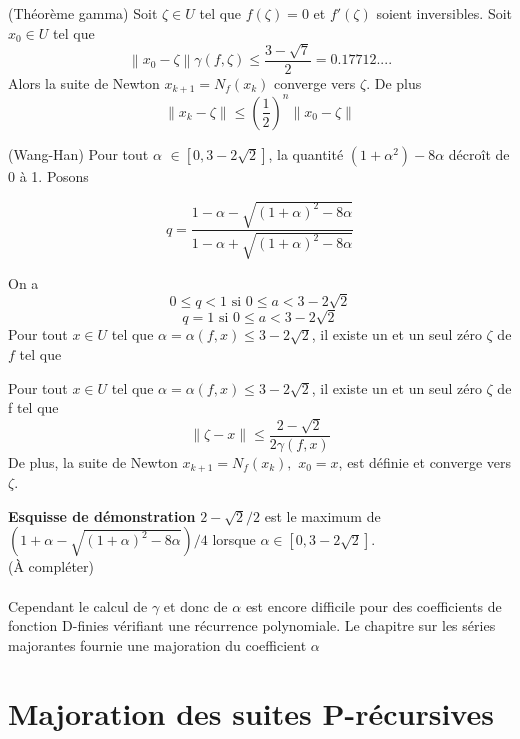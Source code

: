 \documentclass[a4paper,10.5pt]{article}
\begin{document}
	\begin{theorem}(Théorème gamma) Soit $\zeta \in U$ tel que $f(\zeta)=0$ et $f'(\zeta)$ soient inversibles. Soit $x_{0} \in U$ tel que \\
		\[\left\|x_{0}-\zeta\right\|\gamma(f,\zeta) \leq \frac{3-\sqrt{7}}{2}=0.17712.... \]
		Alors la suite de Newton $x_{k+1}=N_{f}(x_{k})$ converge vers $\zeta$. De plus\\
		\[\left\|x_{k}-\zeta\right\| \leq \left(\frac{1}{2}\right)^{n}\left\|x_{0}-\zeta\right\|\]
	\end{theorem}
	
	
	\begin{theorem}(Wang-Han)
		Pour tout $\alpha$ $\in [0,3-2\sqrt{2}]$, la quantité $(1+\alpha^{2})-8\alpha$ décroît de 0 à 1. Posons
		
		\[q=\frac{1-\alpha-\sqrt{(1+\alpha)^{2}-8\alpha}}{1-\alpha+\sqrt{(1+\alpha)^{2}-8\alpha}}\]
		
		On a
		\[0 \leq q<1 \text{ si } 0 \leq a < 3-2\sqrt{2}\]
		\[q=1        \text{ si } 0 \leq a < 3-2\sqrt{2}\]
		Pour tout $x\in U$ tel que $\alpha=\alpha(f,x) \leq 3-2\sqrt{2}$, il existe un et un seul zéro $\zeta$ de $f$ tel que\\
	\end{theorem}
	
	
	\begin{corollaire}
		Pour tout $x\in U$ tel que $\alpha=\alpha(f,x) \leq 3-2\sqrt{2}$, il existe un et un seul zéro $\zeta$ de f tel que
		\[\left\|\zeta-x\right\|\leq\frac{2-\sqrt{2}}{2\gamma(f,x)}\]
		De plus, la suite de Newton $x_{k+1}=N_{f}(x_{k}),$ $x_{0}=x$, est définie et converge vers $\zeta$.
	\end{corollaire}
	\noindent \textbf{Esquisse de démonstration} $2-\sqrt2/2$ est le maximum de $(1+\alpha-\sqrt{(1+\alpha)^{2}-8\alpha})/4$ lorsque $\alpha \in [0,3-2\sqrt2]$.
	\\
	(À compléter)\\
	\\
    Cependant le calcul de $\gamma$ et donc de $\alpha$ est encore difficile pour des coefficients de fonction D-finies vérifiant une récurrence polynomiale. Le chapitre sur les séries majorantes fournie une majoration du coefficient $\alpha$
	
	
	
	
	\section{Majoration des suites P-récursives}
	
\end{document}
